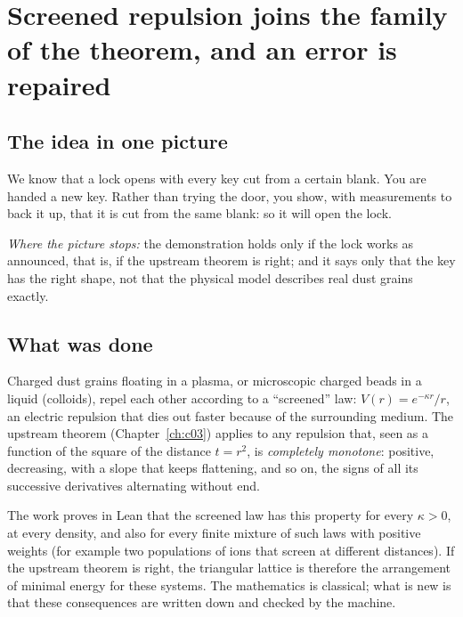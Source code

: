\chapter[Screened repulsion, error repaired]{Screened repulsion joins the family of the theorem, and an error is repaired}

\section*{The idea in one picture}

\begin{analogie}
We know that a lock opens with every key cut from a certain blank. You are handed a new key. Rather than trying the
door, you show, with measurements to back it up, that it is cut from the same blank: so it will open the lock.

\emph{Where the picture stops:} the demonstration holds only if the lock works as announced, that is, if the
upstream theorem is right; and it says only that the key has the right shape, not that the physical model describes
real dust grains exactly.
\end{analogie}

\section*{What was done}

Charged dust grains floating in a plasma, or microscopic charged beads in a liquid (colloids), repel each other
according to a ``screened'' law: $V(r)=e^{-\kappa r}/r$, an electric repulsion that dies out faster because of the
surrounding medium. The upstream theorem (Chapter~\ref{ch:c03}) applies to any repulsion that, seen as a function of the
square of the distance $t=r^2$, is \emph{completely monotone}: positive, decreasing, with a slope that keeps
flattening, and so on, the signs of all its successive derivatives alternating without end.

The work proves in Lean that the screened law has this property for every $\kappa>0$, at every density, and also for
every finite mixture of such laws with positive weights (for example two populations of ions that screen at
different distances). If the upstream theorem is right, the triangular lattice is therefore the arrangement of
minimal energy for these systems. The mathematics is classical; what is new is that these consequences are written
down and checked by the machine.

